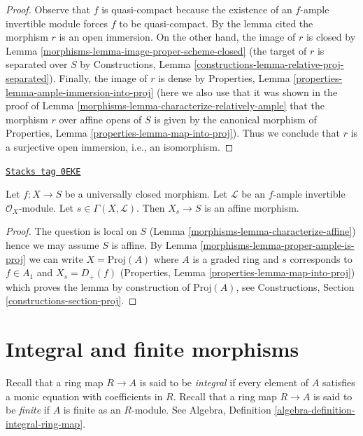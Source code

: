 \begin{proof}

Observe that $f$ is quasi-compact because the existence
of an $f$-ample invertible module forces $f$ to be quasi-compact.
By the lemma cited the morphism $r$ is an open immersion.
On the other hand, the image of $r$ is closed by
Lemma \ref{morphisms-lemma-image-proper-scheme-closed}
(the target of $r$ is separated over $S$ by Constructions,
Lemma \ref{constructions-lemma-relative-proj-separated}).
Finally, the image of $r$ is dense by
Properties, Lemma \ref{properties-lemma-ample-immersion-into-proj}
(here we also use that it was shown in the proof of
Lemma \ref{morphisms-lemma-characterize-relatively-ample}
that the morphism $r$ over affine opens of $S$
is given by the canonical morphism of
Properties, Lemma \ref{properties-lemma-map-into-proj}).
Thus we conclude that $r$ is a surjective open immersion, i.e.,
an isomorphism.
\end{proof}

\begin{lemma}
\label{morphisms-lemma-proper-ample-delete-affine}
\href{https://stacks.math.columbia.edu/tag/0EKE}{\texttt{Stacks tag 0EKE}}

Let $f : X \to S$ be a universally closed morphism. Let $\mathcal{L}$
be an $f$-ample invertible $\mathcal{O}_X$-module. Let
$s \in \Gamma(X, \mathcal{L})$. Then $X_s \to S$ is an affine morphism.
\end{lemma}

\begin{proof}

The question is local on $S$ (Lemma \ref{morphisms-lemma-characterize-affine})
hence we may assume $S$ is affine. By Lemma \ref{morphisms-lemma-proper-ample-is-proj}
we can write $X = \text{Proj}(A)$ where $A$ is a graded
ring and $s$ corresponds to $f \in A_1$ and
$X_s = D_+(f)$ (Properties, Lemma \ref{properties-lemma-map-into-proj})
which proves the lemma by construction of $\text{Proj}(A)$, see
Constructions, Section \ref{constructions-section-proj}.
\end{proof}

\section{Integral and finite morphisms}
\label{morphisms-section-integral}
Recall that a ring map $R \to A$ is said to be {\it integral}
if every element of $A$ satisfies a monic equation with
coefficients in $R$. Recall that a ring map $R \to A$ is
said to be {\it finite} if $A$ is finite as an $R$-module.
See Algebra, Definition \ref{algebra-definition-integral-ring-map}.

